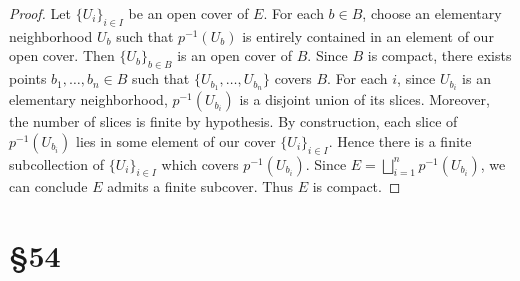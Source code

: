 \documentclass[10pt,oneside,openany]{memoir}
\begin{document}
	\begin{proof}
		Let $\{U_i\}_{i \in I}$ be an open cover of $E$. For each $b \in B$, choose an elementary neighborhood $U_b$ such that $p^{-1}(U_b)$ is entirely contained in an element of our open cover. Then $\{U_b\}_{b \in B}$ is an open cover of $B$. Since $B$ is compact, there exists points $b_1,\ldots,b_n \in B$ such that $\{U_{b_1},\ldots,U_{b_n}\}$ covers $B$. For each $i$, since $U_{b_i}$ is an elementary neighborhood, $p^{-1}(U_{b_i})$ is a disjoint union of its slices. Moreover, the number of slices is finite by hypothesis. By construction, each slice of $p^{-1}(U_{b_i})$ lies in some element of our cover $\{U_i\}_{i \in I}$. Hence there is a finite subcollection of $\{U_i\}_{i \in I}$ which covers $p^{-1}(U_{b_i})$. Since $E = \bigsqcup_{i = 1}^n p^{-1}(U_{b_i})$, we can conclude $E$ admits a finite subcover. Thus $E$ is compact.
	\end{proof}

\section*{\S 54}
\end{document}
